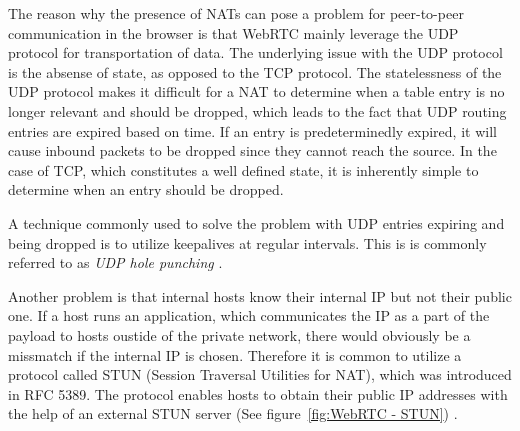 The reason why the presence of NATs can pose a problem for peer-to-peer communication in the browser is that WebRTC mainly leverage the UDP protocol for transportation of data. The underlying issue with the UDP protocol is the absense of state, as opposed to the TCP protocol. The statelessness of the UDP protocol makes it difficult for a NAT to determine when a table entry is no longer relevant and should be dropped, which leads to the fact that UDP routing entries are expired based on time. If an entry is predeterminedly expired, it will cause inbound packets to be dropped since they cannot reach the source. In the case of TCP, which constitutes a well defined state, it is inherently simple to determine when an entry should be dropped.

A technique commonly used to solve the problem with UDP entries expiring and being dropped is to utilize keepalives at regular intervals. This is is commonly referred to as \emph{UDP hole punching} \cite{UDPHolePunching:Online}.

Another problem is that internal hosts know their internal IP but not their public one. If a host runs an application, which communicates the IP as a part of the payload to hosts oustide of the private network, there would obviously be a missmatch if the internal IP is chosen. Therefore it is common to utilize a protocol called STUN (Session Traversal Utilities for NAT), which was introduced in RFC 5389. The protocol enables hosts to obtain their public IP addresses with the help of an external STUN server (See figure~\ref{fig:WebRTC - STUN}) \cite{RFC5389:Online}.

